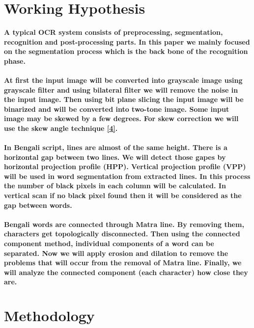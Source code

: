 \documentclass[a4paper,12pt]{article}
\begin{document}
\section{Working Hypothesis}

\paragraph*{A typical OCR system consists of preprocessing, segmentation, recognition and post-processing parts. In this paper we mainly focused on the segmentation process which is the back bone of the recognition phase.}

\paragraph*{At first the input image will be converted into grayscale image using grayscale filter and using bilateral filter we will remove the noise in the input image. Then using bit plane slicing the input image will be binarized and will be converted into two-tone image. Some input image may be skewed by a few degrees. For skew correction we will use the skew angle technique \hyperlink{4}{[4]}.}

\paragraph*{In Bengali script, lines are almost of the same height. There is a horizontal gap between two lines. We will detect those gapes by horizontal projection profile (HPP). Vertical projection profile (VPP) will be used in word segmentation from extracted lines. In this process the number of black pixels in each column will be calculated. In vertical scan if no black pixel found then it will be considered as the gap between words.}

\paragraph*{Bengali words are connected through Matra line. By removing them, characters get topologically disconnected. Then using the connected component method, individual components of a word can be separated. Now we will apply erosion and dilation to remove the problems that will occur from the removal of Matra line. Finally, we will analyze the connected component (each character) how close they are.}

\clearpage

\section{Methodology}
\end{document}
